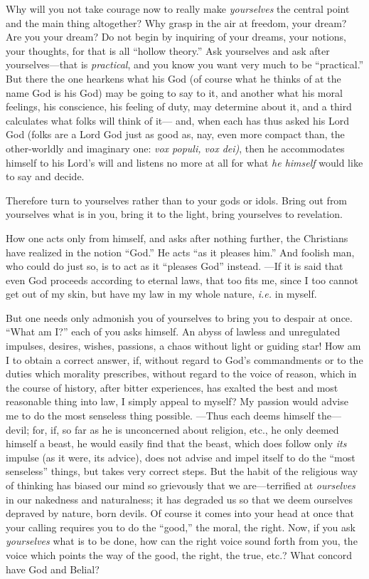 Why will you not take courage now to really make \textit{yourselves} the 
central point and the main thing altogether? Why grasp in the air at freedom, 
your dream? Are you your dream? Do not begin by inquiring of your dreams, your 
notions, your thoughts, for that is all ``hollow theory.'' Ask yourselves 
and ask after yourselves---that is \textit{practical}, and you know you want 
very much to be ``practical.'' But there the one hearkens what his God (of 
course what he thinks of at the name God is his God) may be going to say to 
it, and another what his moral feelings, his conscience, his feeling of duty, 
may determine about it, and a third calculates what folks will think of it--- 
and, when each has thus asked his Lord God (folks are a Lord God just as good 
as, nay, even more compact than, the other-worldly and imaginary one: 
\textit{vox populi, vox dei)}, then he accommodates himself to his Lord's will 
and listens no more at all for what \textit{he himself} would like to say and 
decide.

Therefore turn to yourselves rather than to your gods or idols. Bring out from 
yourselves what is in you, bring it to the light, bring yourselves to 
revelation.

How one acts only from himself, and asks after nothing further, the Christians 
have realized in the notion ``God.'' He acts ``as it pleases him.'' And 
foolish man, who could do just so, is to act as it ``pleases God'' instead. ---If it is said that even God proceeds according to eternal laws, that too 
fits me, since I too cannot get out of my skin, but have my law in my whole 
nature, \textit{i.e.} in myself.

But one needs only admonish you of yourselves to bring you to despair at once. 
``What am I?'' each of you asks himself. An abyss of lawless and unregulated 
impulses, desires, wishes, passions, a chaos without light or guiding star! 
How am I to obtain a correct answer, if, without regard to God's commandments 
or to the duties which morality prescribes, without regard to the voice of 
reason, which in the course of history, after bitter experiences, has exalted 
the best and most reasonable thing into law, I simply appeal to myself? My 
passion would advise me to do the most senseless thing possible. ---Thus each 
deems himself the---devil; for, if, so far as he is unconcerned about 
religion, etc., he only deemed himself a beast, he would easily find that the 
beast, which does follow only \textit{its} impulse (as it were, its advice), 
does not advise and impel itself to do the ``most senseless'' things, but 
takes very correct steps. But the habit of the religious way of thinking has 
biased our mind so grievously that we are---terrified at \textit{ourselves} 
in our nakedness and naturalness; it has degraded us so that we deem ourselves 
depraved by nature, born devils. Of course it comes into your head at once 
that your calling requires you to do the ``good,'' the moral, the right. 
Now, if you ask \textit{yourselves} what is to be done, how can the right 
voice sound forth from you, the voice which points the way of the good, the 
right, the true, etc.? What concord have God and Belial?

